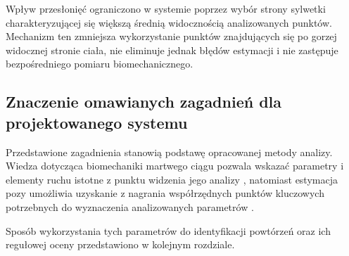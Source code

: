 Wpływ przesłonięć ograniczono w systemie poprzez wybór strony sylwetki charakteryzującej się większą średnią widocznością analizowanych punktów. Mechanizm ten zmniejsza wykorzystanie punktów znajdujących się po gorzej widocznej stronie ciała, nie eliminuje jednak błędów estymacji i nie zastępuje bezpośredniego pomiaru biomechanicznego.

\subsection{Znaczenie omawianych zagadnień dla projektowanego systemu}

Przedstawione zagadnienia stanowią podstawę opracowanej metody analizy. Wiedza dotycząca biomechaniki martwego ciągu pozwala wskazać parametry i elementy ruchu istotne z punktu widzenia jego analizy \cite{hanen2025deadlift,ramirez2022lowback}, natomiast estymacja pozy umożliwia uzyskanie z nagrania współrzędnych punktów kluczowych potrzebnych do wyznaczenia analizowanych parametrów \cite{mediapipe_pose_landmarker}.

Sposób wykorzystania tych parametrów do identyfikacji powtórzeń oraz ich regułowej oceny przedstawiono w kolejnym rozdziale.